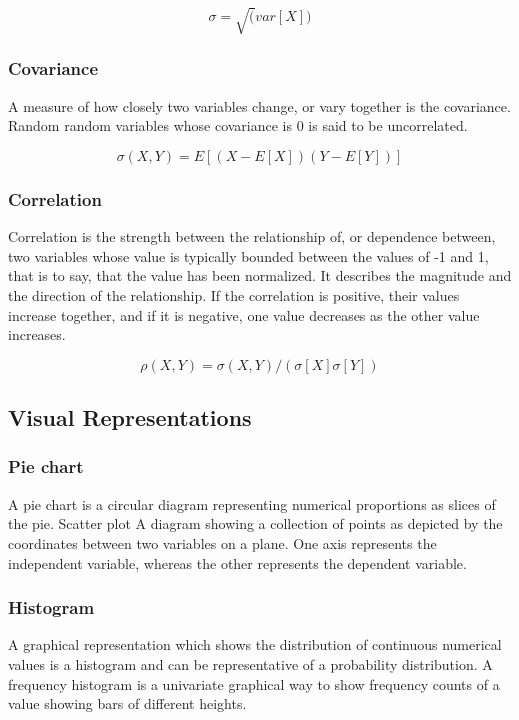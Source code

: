 \documentclass[12pt,]{article}
\begin{document}
\[ \sigma = \sqrt(var[X]) \]

\subsubsection{Covariance}\label{covariance}

A measure of how closely two variables change, or vary together is the
covariance. Random random variables whose covariance is 0 is said to be
uncorrelated.

\[ \sigma(X, Y) = E[(X - E[X])(Y-E[Y])] \]

\subsubsection{Correlation}\label{correlation}

Correlation is the strength between the relationship of, or dependence
between, two variables whose value is typically bounded between the
values of -1 and 1, that is to say, that the value has been normalized.
It describes the magnitude and the direction of the relationship. If the
correlation is positive, their values increase together, and if it is
negative, one value decreases as the other value increases.

\[ \rho(X, Y) = \sigma(X, Y) / (\sigma [X] \sigma [Y]) \]

\subsection{Visual Representations}\label{visual-representations}

\subsubsection{Pie chart}\label{pie-chart}

A pie chart is a circular diagram representing numerical proportions as
slices of the pie. Scatter plot A diagram showing a collection of points
as depicted by the coordinates between two variables on a plane. One
axis represents the independent variable, whereas the other represents
the dependent variable.

\subsubsection{Histogram}\label{histogram}

A graphical representation which shows the distribution of continuous
numerical values is a histogram and can be representative of a
probability distribution. A frequency histogram is a univariate
graphical way to show frequency counts of a value showing bars of
different heights.
\end{document}
